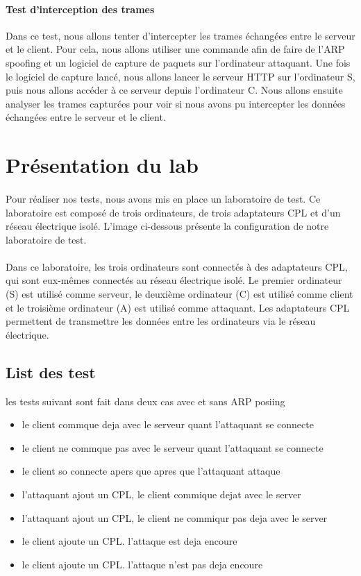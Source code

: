 \documentclass[a4paper,twocolumn]{report}
\begin{document}
\paragraph{Test d'interception des trames} Dans ce test, nous allons tenter d'intercepter
les trames échangées entre le serveur et le client. Pour cela, nous allons utiliser une commande
afin de faire de l'ARP spoofing et un logiciel de capture de paquets sur l'ordinateur attaquant.
Une fois le logiciel de capture lancé, nous allons lancer le serveur HTTP sur l'ordinateur S,
puis nous allons accéder à ce serveur depuis l'ordinateur C. Nous allons ensuite analyser
les trames capturées pour voir si nous avons pu intercepter les données échangées entre le serveur et le client.

\section{Présentation du lab}
\paragraph{}Pour réaliser nos tests, nous avons mis en place un laboratoire de test.
Ce laboratoire est composé de trois ordinateurs, de trois adaptateurs CPL et d'un réseau électrique isolé.
L'image ci-dessous présente la configuration de notre laboratoire de test.
\paragraph{}Dans ce laboratoire, les trois ordinateurs sont connectés à des adaptateurs CPL,
qui sont eux-mêmes connectés au réseau électrique isolé. Le premier ordinateur (S) est utilisé comme serveur,
le deuxième ordinateur (C) est utilisé comme client et le troisième ordinateur (A) est utilisé comme attaquant.
Les adaptateurs CPL permettent de transmettre les données entre les ordinateurs via le réseau électrique.

\subsection{List des test}
les tests suivant sont fait dans deux cas avec et sans ARP posiing
\begin{itemize}
  \item le client commque deja avec le serveur quant l'attaquant se connecte
  \item le client ne commque pas avec le serveur quant l'attaquant se connecte
  \item le client so connecte apers que apres que l'attaquant attaque
  \item l'attaquant ajout un CPL, le client commique dejat avec le server
  \item l'attaquant ajout un CPL, le client ne commiqur pas deja avec le server
  \item le client ajoute un CPL. l'attaque est deja encoure
  \item le client ajoute un CPL. l'attaque n'est pas deja encoure
\end{itemize}
\end{document}

